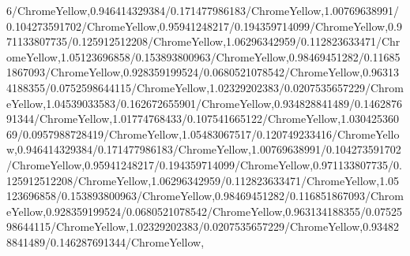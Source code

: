 {\begin{tikzternal}
{6/ChromeYellow,0.946414329384/0.171477986183/ChromeYellow,1.00769638991/0.104273591702/ChromeYellow,0.95941248217/0.194359714099/ChromeYellow,0.971133807735/0.125912512208/ChromeYellow,1.06296342959/0.112823633471/ChromeYellow,1.05123696858/0.153893800963/ChromeYellow,0.98469451282/0.116851867093/ChromeYellow,0.928359199524/0.0680521078542/ChromeYellow,0.963134188355/0.0752598644115/ChromeYellow,1.02329202383/0.0207535657229/ChromeYellow,1.04539033583/0.162672655901/ChromeYellow,0.934828841489/0.146287691344/ChromeYellow,1.01774768433/0.107541665122/ChromeYellow,1.03042536069/0.0957988728419/ChromeYellow,1.05483067517/0.120749233416/ChromeYellow,0.946414329384/0.171477986183/ChromeYellow,1.00769638991/0.104273591702/ChromeYellow,0.95941248217/0.194359714099/ChromeYellow,0.971133807735/0.125912512208/ChromeYellow,1.06296342959/0.112823633471/ChromeYellow,1.05123696858/0.153893800963/ChromeYellow,0.98469451282/0.116851867093/ChromeYellow,0.928359199524/0.0680521078542/ChromeYellow,0.963134188355/0.0752598644115/ChromeYellow,1.02329202383/0.0207535657229/ChromeYellow,0.934828841489/0.146287691344/ChromeYellow,
}
\end{tikzternal}}
